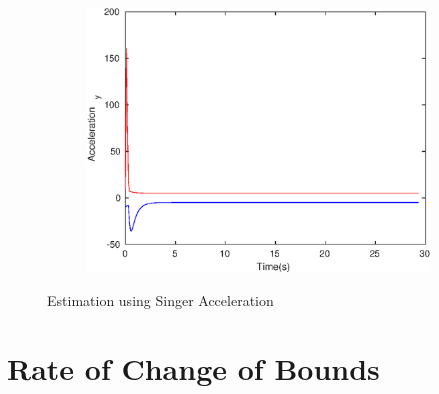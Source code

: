 \begin{figure}[h]
\begin{subfigure}{.5\linewidth}
\end{subfigure}
\begin{subfigure}{.5\linewidth}
\centering
\includegraphics[width=.9\linewidth]{figures/HInf/s3csHInfAcceleration_y}
\end{subfigure}
\caption{Estimation using Singer Acceleration}
\end{figure}


\section{Rate of Change of Bounds}
\FloatBarrier
